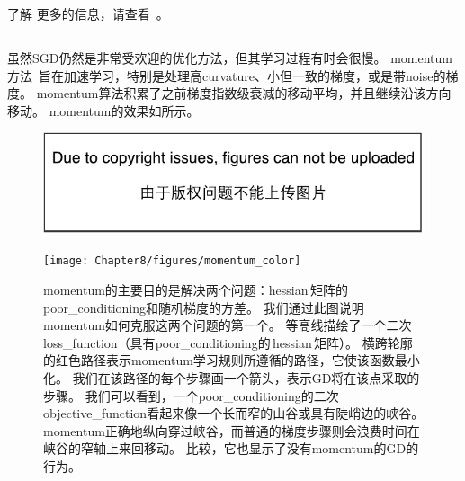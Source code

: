 
了解\,\,更多的信息，请查看~\cite{Bottou98}。


\subsection{}
\label{sec:momentum}
虽然\gls{SGD}仍然是非常受欢迎的优化方法，但其学习过程有时会很慢。
\gls{momentum}方法~\citep{polyak1964some}旨在加速学习，特别是处理高\gls{curvature}、小但一致的梯度，或是带\gls{noise}的梯度。
\gls{momentum}算法积累了之前梯度指数级衰减的移动平均，并且继续沿该方向移动。
\gls{momentum}的效果如所示。



\begin{figure}[!htb]
\ifOpenSource
\centerline{\includegraphics{figure.pdf}}
\else
\centerline{\texttt{[image: Chapter8/figures/momentum\_color]}}
\fi
\caption{\gls{momentum}的主要目的是解决两个问题：\gls{hessian}\,矩阵的\gls{poor_conditioning}和随机梯度的方差。 
我们通过此图说明\gls{momentum}如何克服这两个问题的第一个。
等高线描绘了一个二次\gls{loss_function}（具有\gls{poor_conditioning}的\,\gls{hessian}\,矩阵）。
横跨轮廓的红色路径表示\gls{momentum}学习规则所遵循的路径，它使该函数最小化。
我们在该路径的每个步骤画一个箭头，表示\gls{GD}将在该点采取的步骤。
我们可以看到，一个\gls{poor_conditioning}的二次\gls{objective_function}看起来像一个长而窄的山谷或具有陡峭边的峡谷。
\gls{momentum}正确地纵向穿过峡谷，而普通的梯度步骤则会浪费时间在峡谷的窄轴上来回移动。
比较，它也显示了没有\gls{momentum}的\gls{GD}的行为。
}
\label{fig:chap8_momentum}
\end{figure}


